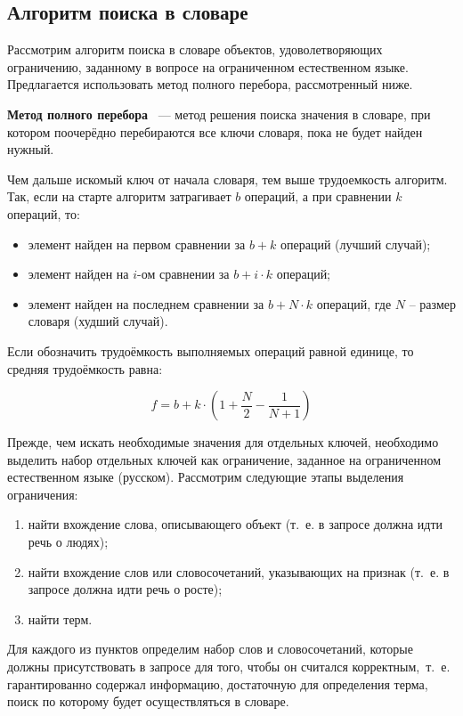 \subsection{Алгоритм поиска в словаре}

Рассмотрим алгоритм поиска в словаре объектов, удоволетворяющих ограничению, заданному в вопросе на ограниченном естественном языке.
Предлагается использовать метод полного перебора, рассмотренный ниже.

\textbf{Метод полного перебора}~\cite{full-comb} --- метод решения поиска значения в словаре, при котором поочерёдно перебираются все ключи словаря, пока не будет найден нужный.

Чем дальше искомый ключ от начала словаря, тем выше трудоемкость алгоритм. Так, если на старте алгоритм затрагивает $b$ операций, а при сравнении $k$ операций, то:\newline
\begin{itemize}[label=---]
	\item элемент найден на первом сравнении за $b + k$ операций (лучший случай);
	\item элемент найден на $i$-ом сравнении за $b + i \cdot k$ операций;
	\item элемент найден на последнем сравнении за $b +  N \cdot k$ операций, где $N$ -- размер словаря (худший случай).
\end{itemize}

Если обозначить трудоёмкость выполняемых операций равной единице, то средняя трудоёмкость равна:

\begin{equation}
	f = b + k \cdot \left(1 + \frac{N}{2} - \frac{1}{N + 1}\right)
\end{equation}

Прежде, чем искать необходимые значения для отдельных ключей, необходимо выделить набор отдельных ключей как ограничение, заданное на ограниченном естественном языке (русском). 
Рассмотрим следующие этапы выделения ограничения:
\begin{enumerate}[label=\arabic*)]
	\item найти вхождение слова, описывающего объект (т.~е. в запросе должна идти речь о людях);
	\item найти вхождение слов или словосочетаний, указывающих на признак (т.~е. в запросе должна идти речь о росте);
	\item найти терм.
 \end{enumerate}

Для каждого из пунктов определим набор слов и словосочетаний, которые должны присутствовать в запросе для того, чтобы он считался корректным,~т.~е. гарантированно содержал информацию, достаточную для определения терма, поиск по которому будет осуществляться в словаре.

